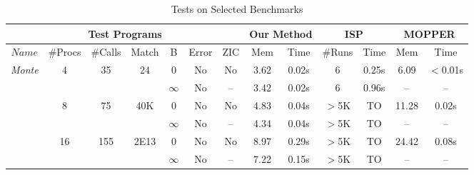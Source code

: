 \begin{savenotes}
\begin{table*}[t]
\begin{center}
\scriptsize
\caption{Tests on Selected Benchmarks}\label{table:benchmarks}
     \begin{threeparttable}
\begin{tabular}{|c|c|c|c|c|c|c|c|c|c|c|c|c|}
		\hline
         \multicolumn{7}{|c|}{Test Programs} & \multicolumn{2}{c|}{Our Method} & \multicolumn{2}{c|}{ISP} & \multicolumn{2}{c|}{MOPPER}  \\ \hline
          $Name$ & \#Procs & \#Calls&Match&B&Error & ZIC &Mem & Time &\#Runs&Time & Mem & Time\\ \hline
          \multirow{6}{*}{\textit{Monte}} & \multirow{2}{*}{4} & \multirow{2}{*}{35} &  \multirow{2}{*}{24} 
          												     & 0 & No & No\tnote{\textdagger} & 3.62 & 0.02s & 6 & 0.25s & 6.09 & $<$0.01s\\ \cline{5-13}
          						       &                            & &  &  $\infty$ & No & -- & 3.42 & 0.02s & 6 & 0.96s &  -- & --\\ \cline{2-13}
						       		& \multirow{2}{*}{8} & \multirow{2}{*}{75} &  \multirow{2}{*}{40K} 
          												     & 0 & No & No\tnote{\textdagger} & 4.83 & 0.04s & $>$5K & TO & 11.28 & 0.02s\\ \cline{5-13}
          						       &                            & &  &  $\infty$ & No & -- & 4.34 & 0.04s & $>$5K & TO &  -- & --\\ \cline{2-13}
						              & \multirow{2}{*}{16} & \multirow{2}{*}{155} &  \multirow{2}{*}{2E13} 
          												     & 0 & No & No\tnote{\textdagger} & 8.97 & 0.29s & $>$5K & TO & 24.42 & 0.08s\\ \cline{5-13}
          						       &                            & &  &  $\infty$ & No & -- & 7.22 & 0.15s & $>$5K & TO & --  & --\\ \hline
						       \hline
						       

\end{tabular}
\end{threeparttable}
\end{center}
\end{table*}
\end{savenotes}

